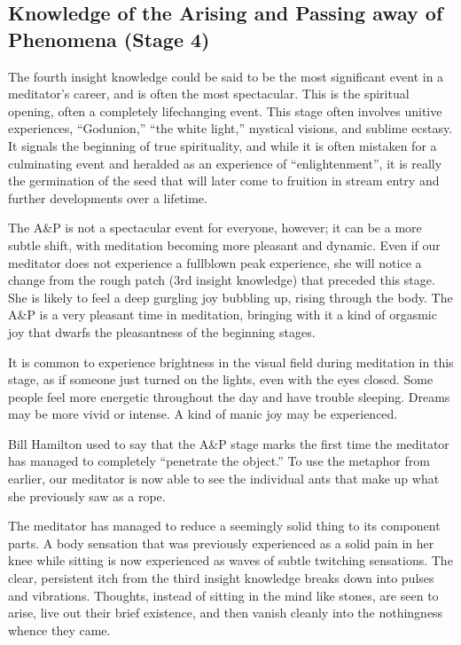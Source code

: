 \documentclass[a5paper,10pt,english]{book}
\begin{document}
\subsection{Knowledge of the Arising and Passing away of Phenomena (Stage 4)}
\label{\detokenize{main-2:knowledge-of-the-arising-and-passing-away-of-phenomena-stage-4}}
\sphinxAtStartPar
The fourth insight knowledge could be said to be the most significant
event in a meditator’s career, and is often the most spectacular. This
is the spiritual opening, often a completely life\sphinxhyphen{}changing event. This
stage often involves unitive experiences, “God\sphinxhyphen{}union,” “the white
light,” mystical visions, and sublime ecstasy. It signals the beginning
of true spirituality, and while it is often mistaken for a culminating
event and heralded as an experience of “enlightenment”, it is really the
germination of the seed that will later come to fruition in stream entry
and further developments over a lifetime.

\sphinxAtStartPar
The A\&P is not a spectacular event for everyone, however; it can be a
more subtle shift, with meditation becoming more pleasant and dynamic.
Even if our meditator does not experience a full\sphinxhyphen{}blown peak experience,
she will notice a change from the rough patch (3rd insight knowledge)
that preceded this stage. She is likely to feel a deep gurgling joy
bubbling up, rising through the body. The A\&P is a very pleasant time in
meditation, bringing with it a kind of orgasmic joy that dwarfs the
pleasantness of the beginning stages.

\sphinxAtStartPar
It is common to experience brightness in the visual field during
meditation in this stage, as if someone just turned on the lights, even
with the eyes closed. Some people feel more energetic throughout the day
and have trouble sleeping. Dreams may be more vivid or intense. A kind
of manic joy may be experienced.

\sphinxAtStartPar
Bill Hamilton used to say that the A\&P stage marks the first time the
meditator has managed to completely “penetrate the object.” To use the
metaphor from earlier, our meditator is now able to see the individual
ants that make up what she previously saw as a rope.

\sphinxAtStartPar
The meditator has managed to reduce a seemingly solid thing to its
component parts. A body sensation that was previously experienced as a
solid pain in her knee while sitting is now experienced as waves of
subtle twitching sensations. The clear, persistent itch from the third
insight knowledge breaks down into pulses and vibrations. Thoughts,
instead of sitting in the mind like stones, are seen to arise, live out
their brief existence, and then vanish cleanly into the nothingness
whence they came.
\end{document}
